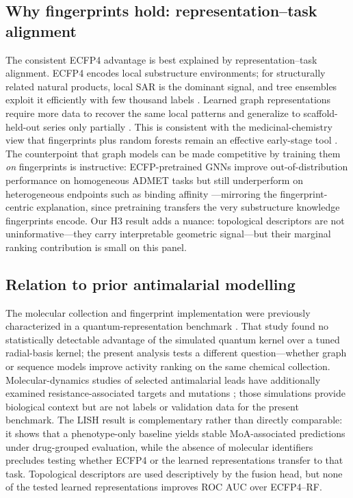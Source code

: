\documentclass[11pt,a4paper]{article}
\begin{document}
\subsection{Why fingerprints hold: representation--task alignment}

The consistent ECFP4 advantage is best explained by representation--task alignment. ECFP4 encodes local substructure environments; for structurally related natural products, local SAR is the dominant signal, and tree ensembles exploit it efficiently with few thousand labels \citep{ecfp_2010}. Learned graph representations require more data to recover the same local patterns and generalize to scaffold-held-out series only partially \citep{benchmark_pretrained_2025}. This is consistent with the medicinal-chemistry view that fingerprints plus random forests remain an effective early-stage tool \citep{learning_mol_repr_2020}. The counterpoint that graph models can be made competitive by training them \emph{on} fingerprints is instructive: ECFP-pretrained GNNs improve out-of-distribution performance on homogeneous ADMET tasks but still underperform on heterogeneous endpoints such as binding affinity \citep{ecfp_pretrained_2026}---mirroring the fingerprint-centric explanation, since pretraining transfers the very substructure knowledge fingerprints encode. Our H3 result adds a nuance: topological descriptors are not uninformative---they carry interpretable geometric signal---but their marginal ranking contribution is small on this panel.

\subsection{Relation to prior antimalarial modelling}

The molecular collection and fingerprint implementation were previously characterized in a quantum-representation benchmark \citep{temgoua2027quantum}. That study found no statistically detectable advantage of the simulated quantum kernel over a tuned radial-basis kernel; the present analysis tests a different question---whether graph or sequence models improve activity ranking on the same chemical collection. Molecular-dynamics studies of selected antimalarial leads have additionally examined resistance-associated targets and mutations \citep{temgoua2027md}; those simulations provide biological context but are not labels or validation data for the present benchmark. The LISH result is complementary rather than directly comparable: it shows that a phenotype-only baseline yields stable MoA-associated predictions under drug-grouped evaluation, while the absence of molecular identifiers precludes testing whether ECFP4 or the learned representations transfer to that task. Topological descriptors are used descriptively by the fusion head, but none of the tested learned representations improves ROC AUC over ECFP4--RF.
\end{document}
